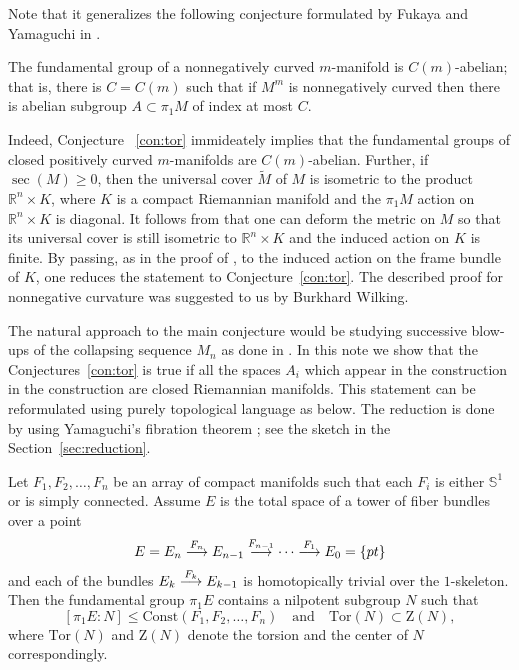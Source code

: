 \documentclass{amsart}
\begin{document}
Note that it generalizes the following conjecture formulated by Fukaya and Yamaguchi in \cite{FY}.

\begin{conj}\label{con:c-ab}
The fundamental group of a nonnegatively curved  $m$-manifold is $C(m)$-abelian;
that is, there is $C=C(m)$ such that if $M^m$ is nonnegatively curved then there is abelian subgroup $A\subset \pi_1M$ of index  at most $C$.
\end{conj}

Indeed, Conjecture ~\ref{con:tor} immideately implies that the fundamental
groups of closed positively curved $m$-manifolds are $C(m)$-abelian.
Further, if $\sec(M)\ge0$, then the universal cover $\tilde M$ of $M$ is isometric to the product $\mathbb{R}^n\times K$, where $K$ is a compact Riemannian manifold and the $\pi_1M$ action  on $\mathbb{R}^n\times K$ is diagonal.
It follows from \cite[Cor. 6.3]{wilking} that one can deform the metric on $M$ so that its universal cover is still isometric to $\mathbb{R}^n\times K$ and the induced action on $K$ is finite.
By passing, as in the proof of \cite[Corollary 4.6.1]{KPT}, to the induced action on the frame bundle of $K$, one reduces the statement to Conjecture~\ref{con:tor}.
The described  proof for nonnegative curvature was suggested to us by Burkhard Wilking.

The natural approach to the main conjecture would be studying successive blow-ups of the
collapsing sequence $M_n$ as done in \cite[Section 4.3]{KPT}.
In this note we show that the Conjectures~\ref{con:tor} is true if all the spaces $A_i$ which appear in the construction in the construction are closed Riemannian manifolds.
This statement can be reformulated using purely topological language as below.
The reduction is done by using Yamaguchi's fibration theorem \cite{Yam};
see the sketch in the Section~\ref{sec:reduction}.

\begin{thm}\label{thm:smooth}
Let $F_1,F_2,\dots,F_n$ be an array of compact manifolds 
such that each $F_i$ is either $\mathbb{S}^{1}$ or is simply connected. 
Assume $E$ is the total space of a tower of fiber bundles over a point
$$E=E_n\buildrel {F_n}\over \longrightarrow E_{n-1}\buildrel {F_{n-1}}\over\longrightarrow\dots\buildrel {F_1}\over\longrightarrow E_0=\{pt\}$$
and each of the bundles $E_k\buildrel {F_k}\over \longrightarrow E_{k-1}$ is homotopically trivial over the $1$-skeleton. 
Then the fundamental group $\pi_1E$ contains a nilpotent subgroup $N$ such that
$$[\pi_1E:N]\le \mathrm{Const}(F_1,F_2,\dots,F_n)\quad\text{and}\quad\mathrm{Tor}(N)\subset \mathrm{Z}(N),$$
where $\mathrm{Tor}(N)$ and $\mathrm{Z}(N)$ denote the torsion and the center of $N$ correspondingly.
\end{thm}
\end{document}
